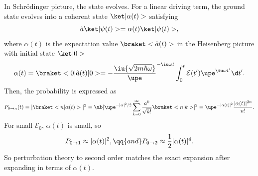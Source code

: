 \begin{solution}
\begin{enumext}
    In Schr\"odinger picture, the state evolves. For a linear driving term, the ground state evolves into a coherent state $\ket|\alpha(t)>$ satisfying
    \[
      \hat a\ket|\psi(t)> = \alpha(t) \ket|\psi(t)>,
    \]
    where $\alpha(t)$ is the expectation value $\braket<\hat a(t)>$ in the Heisenberg picture with initial state $\ket|0>$
    \[
      \alpha(t) = \braket<0|\hat a(t)|0> = -\frac\iu{\sqrt{2m\hbar\omega}} \upe^{-\iu\omega t}
      \int_0^t \mathcal E(t') \upe^{\iu\omega t'} \d t'.
    \]
    Then, the probability is expressed as
    \[
      P_{0\to n}(t) = |\braket<n|\alpha(t)>|^2
    = \ab|{\upe^{-|\alpha|^2/2}
            \sum_{k=0}^\infty \frac{a^k}{\sqrt{k!}}\braket<n|k>}|^2
    = \upe^{-|\alpha(t)|^2} \frac{|\alpha(t)|^{2n}}{n!}.
    \]
    For small $\mathcal E_0$, $\alpha(t)$ is small, so
    \[
      P_{0\to1} \approx |\alpha(t)|^2, \qq{and} P_{0\to2} \approx \frac12|\alpha(t)|^4.
    \]
    So perturbation theory to second order matches the exact expansion after expanding in terms of $\alpha(t)$.
  \end{enumext}
\end{solution}

\newpage

